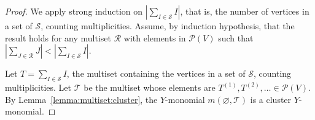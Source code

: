 \documentclass[11pt]{article}
\theoremstyle{definition}
\numberwithin{equation}{section}
\newcommand{\mtp}[1]{^{(#1)}} \newcommand{\graph}{\varGamma}
\newcommand{\vertices}{V}
\newcommand{\powerset}[1]{\mathcal{P}(#1)}
\newcommand{\monomial}[2]{m(#1, #2)}
\begin{document}
\begin{proof}
    We apply strong induction on \(\left| \sum_{I \in \mathcal{S}} I \right|\),
    that is, the number of vertices in a set of \(\mathcal{S}\), counting multiplicities.
    Assume, by induction hypothesis, that the result holds for any multiset \(\mathcal{R}\) with elements in \(\powerset{\vertices}\) such that \(\left| \sum_{J \in \mathcal{R}} J \right| < \left| \sum_{I \in \mathcal{S}} I \right|\).

    Let \(T = \sum_{I \in \mathcal{S}} I\), the multiset containing the vertices in a set of \(\mathcal{S}\), counting multiplicities.
    Let \(\mathcal{T}\) be the multiset whose elements are \(T\mtp{1}, T\mtp{2}, \dots \in \powerset{\vertices}\).
    By Lemma~\ref{lemma:multiset:cluster}, the \(Y\)-monomial \(\monomial{\varnothing}{\mathcal{T}}\) is a cluster \(Y\)-monomial.


\end{proof}
\end{document}
